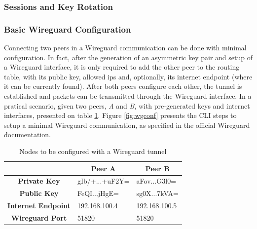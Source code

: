 \documentclass[11pt,twoside,a4paper]{report}
\begin{document}
\subsubsection{Sessions and Key Rotation}


\subsubsection{Basic Wireguard Configuration}

Connecting two peers in a Wireguard communication can be done with minimal configuration. In fact, after the generation of an asymmetric key pair and setup of a Wireguard interface, it is only required to add the other peer to the routing table, with its public key, allowed ips and, optionally, its internet endpoint (where it can be currently found). After both peers configure each other, the tunnel is established and packets can be transmitted through the Wireguard interface.
In a pratical scenario, given two peers, \emph{A} and \emph{B}, with pre-generated keys and internet interfaces, presented on table \ref{tab:wgconfpeers}. Figure \ref{fig:wgconf} presents the CLI steps to setup a minimal Wireguard communication, as specified in the official Wireguard documentation.


\begin{table}[]
\centering
\begin{tabular}{c|l|l|}
\cline{2-3}
\multicolumn{1}{l|}{}                            & \multicolumn{1}{c|}{\textbf{Peer A}} & \multicolumn{1}{c|}{\textbf{Peer B}} \\ \hline
\multicolumn{1}{|c|}{\textbf{Private Key}}       & gIb/+...+uF2Y=                       & aFov...G3l0=                         \\ \hline
\multicolumn{1}{|c|}{\textbf{Public Key}}        & FeQI...jHgE=                         & sg0X...7kVA=                         \\ \hline
\multicolumn{1}{|c|}{\textbf{Internet Endpoint}} & 192.168.100.4                        & 192.168.100.5                        \\ \hline
\multicolumn{1}{|c|}{\textbf{Wireguard Port}}    & 51820                                & 51820                                \\ \hline
\end{tabular}
\label{tab:wgconfpeers}
\caption{Nodes to be configured with a Wireguard tunnel}
\end{table}
\end{document}
